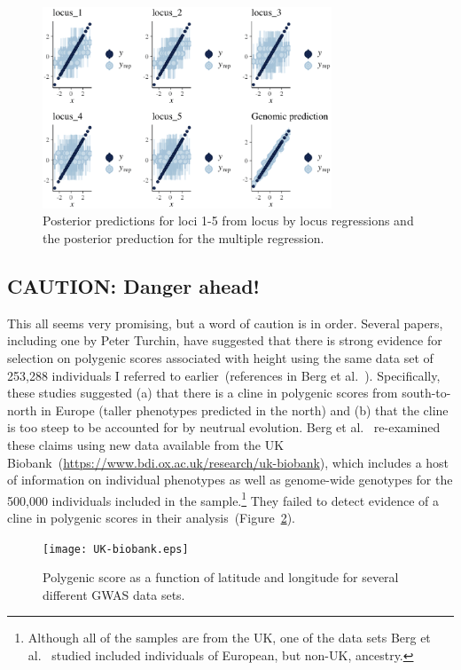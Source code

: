 \begin{figure}
  \begin{center}
    \includegraphics[height=6cm]{genomic-prediction-multiple.eps}
  \end{center}
  \caption{Posterior predictions for loci 1-5 from locus by locus
    regressions and the posterior preduction for the multiple
    regression.}\label{fig:multiple}
\end{figure}

\subsection*{CAUTION: Danger ahead!}

This all seems very promising, but a word of caution is in
order. Several papers, including one by Peter Turchin, have suggested
that there is strong evidence for selection on polygenic scores
associated with height using the same data set of 253,288 individuals
I referred to earlier~(references in Berg et
al.~\cite{Berg-etal-2018}). Specifically, these studies suggested (a)
that there is a cline in polygenic scores from south-to-north in
Europe (taller phenotypes predicted in the north) and (b) that the
cline is too steep to be accounted for by neutrual evolution. Berg et
al.~\cite{Berg-etal-2018} re-examined these claims using new data
available from the UK
Biobank~(\url{https://www.bdi.ox.ac.uk/research/uk-biobank}), which
includes a host of information on individual phenotypes as well as
genome-wide genotypes for the 500,000 individuals included in the
sample.\footnote{Although all of the samples are from the UK, one of
  the data sets Berg et al.~\cite{Berg-etal-2018} studied included
  individuals of European, but non-UK, ancestry.} They failed to
detect evidence of a cline in polygenic scores in their
analysis~(Figure~\ref{fig:UK-biobank}).

\begin{figure}
  \begin{center}
    \texttt{[image: UK-biobank.eps]}
  \end{center}
  \caption{Polygenic score as a function of latitude and longitude for
    several different GWAS data sets.}\label{fig:UK-biobank}
\end{figure}

